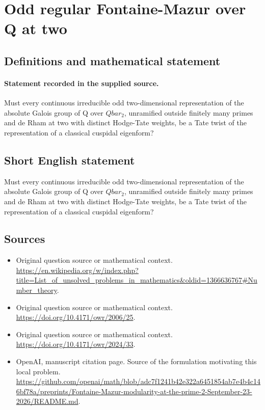 \documentclass[11pt]{article}
\begin{document}
\section*{Odd regular Fontaine-Mazur over Q at two}\label{statement}
\subsection{Definitions and mathematical statement}
\paragraph{Statement recorded in the supplied source.}
Must every continuous irreducible odd two-dimensional representation of the absolute Galois group of Q over $Qbar_2$, unramified outside finitely many primes and de Rham at two with distinct Hodge-Tate weights, be a Tate twist of the representation of a classical cuspidal eigenform?
\subsection{Short English statement}
Must every continuous irreducible odd two-dimensional representation of the absolute Galois group of Q over $Qbar_2$, unramified outside finitely many primes and de Rham at two with distinct Hodge-Tate weights, be a Tate twist of the representation of a classical cuspidal eigenform?
\subsection{Sources}
\begin{itemize}
\item[S1] Original question source or mathematical context.
\url{https://en.wikipedia.org/w/index.php?title=List_of_unsolved_problems_in_mathematics&oldid=1366636767#Number_theory}.
\item[S2] Original question source or mathematical context.
\url{https://doi.org/10.4171/owr/2006/25}.
\item[S3] Original question source or mathematical context.
\url{https://doi.org/10.4171/owr/2024/33}.
\item[S4] OpenAI, manuscript citation page. Source of the formulation motivating this local problem.
\url{https://github.com/openai/math/blob/adc7f1241b42e322a6451854ab7e4b4c146bf78a/preprints/Fontaine-Mazur-modularity-at-the-prime-2-September-23-2026/README.md}.
\end{itemize}
\end{document}
